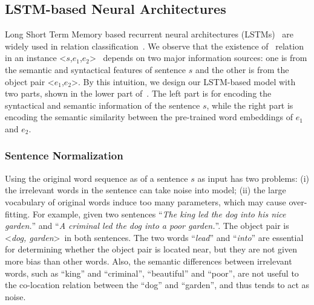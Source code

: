 \subsection{LSTM-based Neural Architectures}
Long Short Term Memory based recurrent neural architectures (LSTMs)~\cite{hochreiter1997long} are widely used in relation classification~\cite{socher2011semi,ebrahimi2015chain,xu2015classifying,xu2016improved}.
We observe that the existence of \lnear~relation in 
an instance \textless $s$,$e_1$,$e_2$\textgreater~ depends 
on two major information sources: one is from the semantic and syntactical features of sentence $s$ 
and the other is from the object pair \textless$e_1$,$e_2$\textgreater.
By this intuition, we design our LSTM-based model with two parts, shown in the lower part of~.
The left part is for encoding the syntactical and semantic information of the sentence $s$, while the right part is encoding the semantic similarity between the pre-trained word embeddings of $e_1$ and $e_2$.


\subsubsection{Sentence Normalization}
Using the original word sequence as of a sentence $s$ as input has two problems:
(i) the irrelevant words in the sentence can take noise into model; 
(ii) the large vocabulary of original words induce too many parameters, which may cause over-fitting.
For example, given two sentences 
``\textit{The king led the dog into his nice garden.}'' and 
``\textit{A criminal led the dog into a poor garden.}''. 
The object pair is \textless \textit{dog, garden}\textgreater~in 
both sentences.
The two words ``\textit{lead}'' and ``\textit{into}'' are essential
for determining whether the object pair is located near, but they are not given more bias than other words. 
Also, the semantic differences between irrelevant words, such as ``king'' and ``criminal'', ``beautiful'' and ``poor'', are not useful to the co-location
relation between the ``dog'' and ``garden'', and 
thus tends to act as noise.

